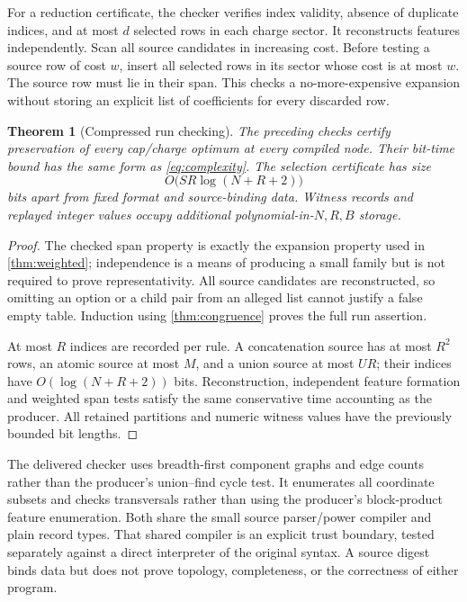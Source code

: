 \documentclass[11pt,a4paper]{article}
\newtheorem{theorem}{Theorem}[section]
\theoremstyle{definition}
\begin{document}
For a reduction certificate, the checker verifies index validity, absence of duplicate indices, and at most $d$ selected rows in each charge sector. It reconstructs features independently. Scan all source candidates in increasing cost. Before testing a source row of cost $w$, insert all selected rows in its sector whose cost is at most $w$. The source row must lie in their span. This checks a no-more-expensive expansion without storing an explicit list of coefficients for every discarded row.

\begin{theorem}[Compressed run checking]\label{thm:checker}
The preceding checks certify preservation of every cap/charge optimum at every compiled node. Their bit-time bound has the same form as \eqref{eq:complexity}. The selection certificate has size
\[
O\bigl(SR\log(N+R+2)\bigr)
\]
bits apart from fixed format and source-binding data. Witness records and replayed integer values occupy additional polynomial-in-$N,R,B$ storage.
\end{theorem}
\begin{proof}
The checked span property is exactly the expansion property used in \cref{thm:weighted}; independence is a means of producing a small family but is not required to prove representativity. All source candidates are reconstructed, so omitting an option or a child pair from an alleged list cannot justify a false empty table. Induction using \cref{thm:congruence} proves the full run assertion.

At most $R$ indices are recorded per rule. A concatenation source has at most $R^2$ rows, an atomic source at most $M$, and a union source at most $UR$; their indices have $O(\log(N+R+2))$ bits. Reconstruction, independent feature formation and weighted span tests satisfy the same conservative time accounting as the producer. All retained partitions and numeric witness values have the previously bounded bit lengths.
\end{proof}

The delivered checker uses breadth-first component graphs and edge counts rather than the producer's union--find cycle test. It enumerates all coordinate subsets and checks transversals rather than using the producer's block-product feature enumeration. Both share the small source parser/power compiler and plain record types. That shared compiler is an explicit trust boundary, tested separately against a direct interpreter of the original syntax. A source digest binds data but does not prove topology, completeness, or the correctness of either program.
\end{document}

